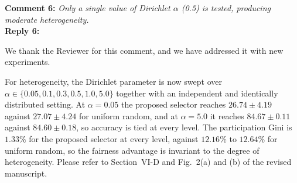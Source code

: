 \documentclass[10pt]{article}
\begin{document}
\noindent
\textbf{Comment 6:} \textit{Only a single value of Dirichlet $\alpha$ (0.5) is tested, producing moderate heterogeneity.} \\
\noindent
\textbf{Reply 6:} {We thank the Reviewer for this comment, and we have addressed it with new experiments.

For heterogeneity, the Dirichlet parameter is now swept over $\alpha \in \{0.05, 0.1, 0.3, 0.5, 1.0, 5.0\}$ together with an independent and identically distributed setting. At $\alpha = 0.05$ the proposed selector reaches $26.74 \pm 4.19$ against $27.07 \pm 4.24$ for uniform random, and at $\alpha = 5.0$ it reaches $84.67 \pm 0.11$ against $84.60 \pm 0.18$, so accuracy is tied at every level. The participation Gini is $1.33\%$ for the proposed selector at every level, against $12.16\%$ to $12.64\%$ for uniform random, so the fairness advantage is invariant to the degree of heterogeneity. Please refer to Section~VI-D and Fig.~2(a) and (b) of the revised manuscript.}\\
\end{document}
